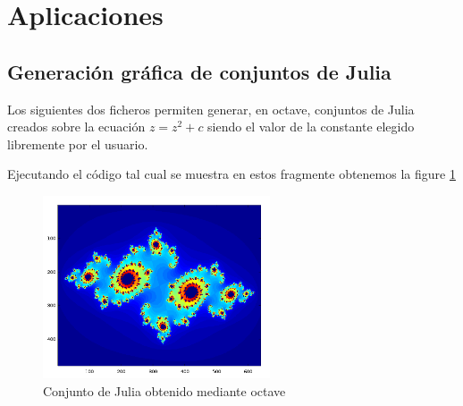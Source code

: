 


\section{Aplicaciones}
\subsection{Generación gráfica de conjuntos de Julia}
Los siguientes dos ficheros permiten generar, en octave, conjuntos de Julia creados sobre la ecuación $z=z^2+c$ siendo el valor de la constante elegido libremente por el usuario.




Ejecutando el código tal cual se muestra en estos fragmente obtenemos la figure \ref{fig:JuliaOctave}

\begin{figure}[hbtp]
\centering
\includegraphics[width = 0.6\textwidth]{img/JuliaOctave.png}
\caption{Conjunto de Julia obtenido mediante octave}
\label{fig:JuliaOctave}
\end{figure}

